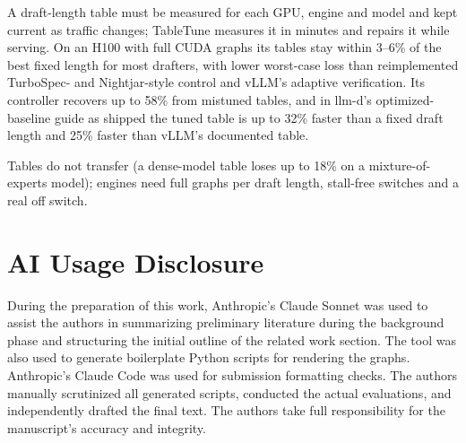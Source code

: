 \documentclass{article}
\newcommand{\sys}{TableTune}
\begin{document}
A draft-length table must be measured for each GPU, engine and model and kept current as traffic changes; \sys{} measures it in minutes and repairs it while serving. On an H100 with full CUDA graphs its tables stay within 3--6\% of the best fixed length for most drafters, with lower worst-case loss than reimplemented TurboSpec- and Nightjar-style control and vLLM's adaptive verification. Its controller recovers up to 58\% from mistuned tables, and in llm-d's optimized-baseline guide as shipped the tuned table is up to 32\% faster than a fixed draft length and 25\% faster than vLLM's documented table.

Tables do not transfer (a dense-model table loses up to 18\% on a mixture-of-experts model); engines need full graphs per draft length, stall-free switches and a real off switch.




\section*{AI Usage Disclosure}

During the preparation of this work, Anthropic's Claude Sonnet was used to assist the authors in summarizing preliminary literature during the background phase and structuring the initial outline of the related work section. The tool was also used to generate boilerplate Python scripts for rendering the graphs. Anthropic's Claude Code was used for submission formatting checks. The authors manually scrutinized all generated scripts, conducted the actual evaluations, and independently drafted the final text. The authors take full responsibility for the manuscript's accuracy and integrity.
\end{document}
